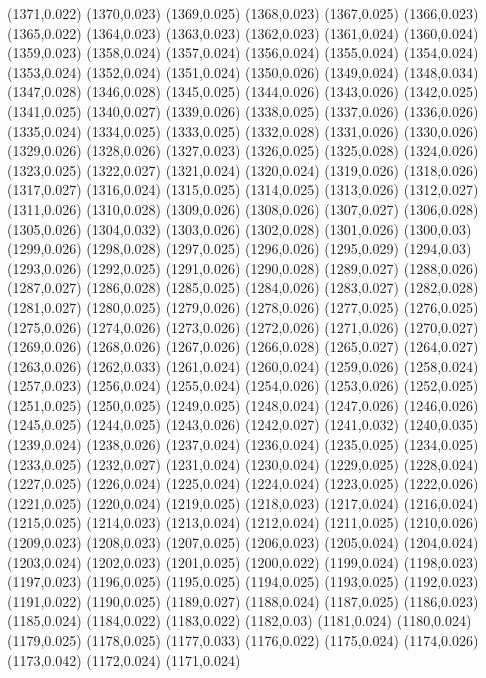 (1371,0.022)
(1370,0.023)
(1369,0.025)
(1368,0.023)
(1367,0.025)
(1366,0.023)
(1365,0.022)
(1364,0.023)
(1363,0.023)
(1362,0.023)
(1361,0.024)
(1360,0.024)
(1359,0.023)
(1358,0.024)
(1357,0.024)
(1356,0.024)
(1355,0.024)
(1354,0.024)
(1353,0.024)
(1352,0.024)
(1351,0.024)
(1350,0.026)
(1349,0.024)
(1348,0.034)
(1347,0.028)
(1346,0.028)
(1345,0.025)
(1344,0.026)
(1343,0.026)
(1342,0.025)
(1341,0.025)
(1340,0.027)
(1339,0.026)
(1338,0.025)
(1337,0.026)
(1336,0.026)
(1335,0.024)
(1334,0.025)
(1333,0.025)
(1332,0.028)
(1331,0.026)
(1330,0.026)
(1329,0.026)
(1328,0.026)
(1327,0.023)
(1326,0.025)
(1325,0.028)
(1324,0.026)
(1323,0.025)
(1322,0.027)
(1321,0.024)
(1320,0.024)
(1319,0.026)
(1318,0.026)
(1317,0.027)
(1316,0.024)
(1315,0.025)
(1314,0.025)
(1313,0.026)
(1312,0.027)
(1311,0.026)
(1310,0.028)
(1309,0.026)
(1308,0.026)
(1307,0.027)
(1306,0.028)
(1305,0.026)
(1304,0.032)
(1303,0.026)
(1302,0.028)
(1301,0.026)
(1300,0.03)
(1299,0.026)
(1298,0.028)
(1297,0.025)
(1296,0.026)
(1295,0.029)
(1294,0.03)
(1293,0.026)
(1292,0.025)
(1291,0.026)
(1290,0.028)
(1289,0.027)
(1288,0.026)
(1287,0.027)
(1286,0.028)
(1285,0.025)
(1284,0.026)
(1283,0.027)
(1282,0.028)
(1281,0.027)
(1280,0.025)
(1279,0.026)
(1278,0.026)
(1277,0.025)
(1276,0.025)
(1275,0.026)
(1274,0.026)
(1273,0.026)
(1272,0.026)
(1271,0.026)
(1270,0.027)
(1269,0.026)
(1268,0.026)
(1267,0.026)
(1266,0.028)
(1265,0.027)
(1264,0.027)
(1263,0.026)
(1262,0.033)
(1261,0.024)
(1260,0.024)
(1259,0.026)
(1258,0.024)
(1257,0.023)
(1256,0.024)
(1255,0.024)
(1254,0.026)
(1253,0.026)
(1252,0.025)
(1251,0.025)
(1250,0.025)
(1249,0.025)
(1248,0.024)
(1247,0.026)
(1246,0.026)
(1245,0.025)
(1244,0.025)
(1243,0.026)
(1242,0.027)
(1241,0.032)
(1240,0.035)
(1239,0.024)
(1238,0.026)
(1237,0.024)
(1236,0.024)
(1235,0.025)
(1234,0.025)
(1233,0.025)
(1232,0.027)
(1231,0.024)
(1230,0.024)
(1229,0.025)
(1228,0.024)
(1227,0.025)
(1226,0.024)
(1225,0.024)
(1224,0.024)
(1223,0.025)
(1222,0.026)
(1221,0.025)
(1220,0.024)
(1219,0.025)
(1218,0.023)
(1217,0.024)
(1216,0.024)
(1215,0.025)
(1214,0.023)
(1213,0.024)
(1212,0.024)
(1211,0.025)
(1210,0.026)
(1209,0.023)
(1208,0.023)
(1207,0.025)
(1206,0.023)
(1205,0.024)
(1204,0.024)
(1203,0.024)
(1202,0.023)
(1201,0.025)
(1200,0.022)
(1199,0.024)
(1198,0.023)
(1197,0.023)
(1196,0.025)
(1195,0.025)
(1194,0.025)
(1193,0.025)
(1192,0.023)
(1191,0.022)
(1190,0.025)
(1189,0.027)
(1188,0.024)
(1187,0.025)
(1186,0.023)
(1185,0.024)
(1184,0.022)
(1183,0.022)
(1182,0.03)
(1181,0.024)
(1180,0.024)
(1179,0.025)
(1178,0.025)
(1177,0.033)
(1176,0.022)
(1175,0.024)
(1174,0.026)
(1173,0.042)
(1172,0.024)
(1171,0.024)
